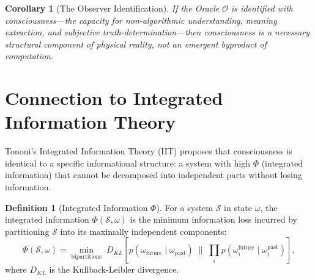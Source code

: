 \documentclass[12pt, a4paper]{article}
\theoremstyle{plain}
\newtheorem{corollary}[theorem]{Corollary}
\theoremstyle{definition}
\newtheorem{definition}[theorem]{Definition}
\theoremstyle{remark}
\newcommand{\calO}{\mathcal{O}}
\newcommand{\calS}{\mathcal{S}}
\begin{document}
\begin{corollary}[The Observer Identification]\label{cor:observer}
  If the Oracle $\calO$ is identified with consciousness---the capacity
  for non-algorithmic understanding, meaning extraction, and subjective
  truth-determination---then consciousness is a \emph{necessary structural
  component} of physical reality, not an emergent byproduct of computation.
\end{corollary}

\section{Connection to Integrated Information Theory}\label{sec:iit}

Tononi's Integrated Information Theory (IIT) \citep{Tononi2004, Oizumi2014}
proposes that consciousness is identical to a specific informational structure:
a system with high $\Phi$ (integrated information) that cannot be decomposed
into independent parts without losing information.

\begin{definition}[Integrated Information $\Phi$]\label{def:phi}
  For a system $\calS$ in state $\omega$, the integrated information
  $\Phi(\calS, \omega)$ is the minimum information loss incurred by
  partitioning $\calS$ into its maximally independent components:
  \begin{equation}
    \Phi(\calS, \omega) = \min_{\text{bipartitions}} \;
    D_{KL}\!\left[p(\omega_{\text{future}} \mid \omega_{\text{past}})
    \;\|\; \prod_i p(\omega_i^{\text{future}} \mid \omega_i^{\text{past}})
    \right],
  \end{equation}
  where $D_{KL}$ is the Kullback-Leibler divergence.
\end{definition}
\end{document}
